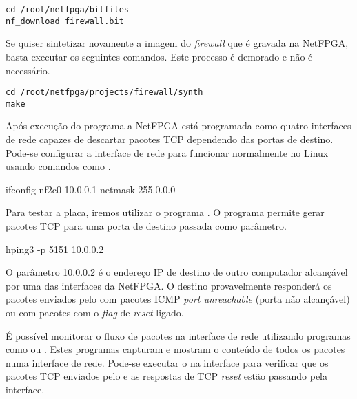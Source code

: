 \begin{verbatim}
cd /root/netfpga/bitfiles
nf_download firewall.bit
\end{verbatim}

Se quiser sintetizar novamente a imagem do \emph{firewall} que é gravada
na NetFPGA, basta executar os seguintes comandos.  Este processo é
demorado e não é necessário.

\begin{verbatim}
cd /root/netfpga/projects/firewall/synth
make
\end{verbatim}

Após execução do programa  a NetFPGA está programada
como quatro interfaces de rede capazes de descartar pacotes TCP
dependendo das portas de destino.  Pode-se configurar a interface de
rede para funcionar normalmente no Linux usando comandos como
.

\begin{verbnobox}[\small]
ifconfig nf2c0 10.0.0.1 netmask 255.0.0.0
\end{verbnobox}

Para testar a placa, iremos utilizar o programa .  O
programa  permite gerar pacotes TCP para uma porta de
destino passada como parâmetro.

\begin{verbnobox}[\small]
hping3 -p 5151 10.0.0.2
\end{verbnobox}

O parâmetro 10.0.0.2 é o endereço IP de destino de outro computador
alcançável por uma das interfaces da NetFPGA.  O destino provavelmente
responderá os pacotes enviados pelo  com pacotes ICMP
\emph{port unreachable} (porta não alcançável) ou com pacotes com o
\emph{flag} de \emph{reset} ligado.\footnotemark{}


É possível monitorar o fluxo de pacotes na interface de rede utilizando
programas como  ou .  Estes programas
capturam e mostram o conteúdo de todos os pacotes numa interface de
rede.  Pode-se executar o  na interface  para
verificar que os pacotes TCP enviados pelo  e as respostas
de TCP \emph{reset} estão passando pela interface.

